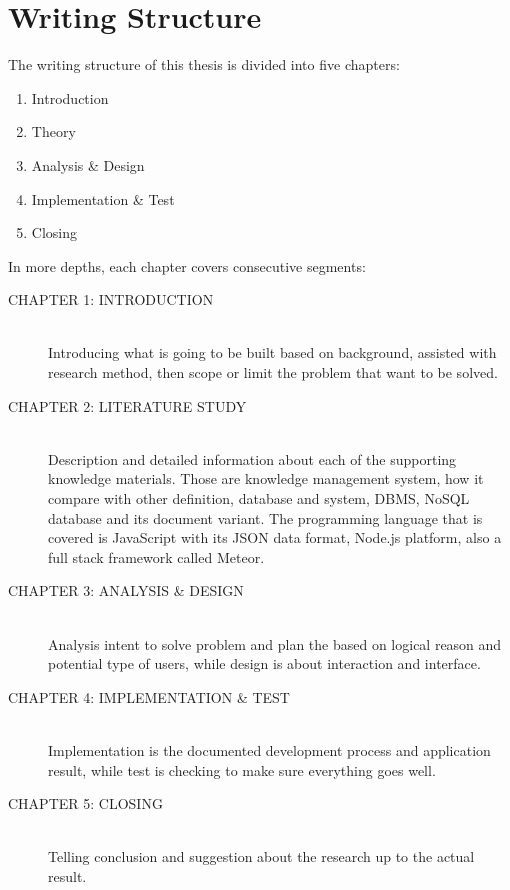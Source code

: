 \section{Writing Structure}
\label{sec:writing-structure}

The writing structure of this thesis is divided into five chapters:

\begin{enumerate}
\item Introduction
\item Theory
\item Analysis \& Design
\item Implementation \& Test
\item Closing
\end{enumerate}

\noindent In more depths, each chapter covers consecutive segments:

\begin{description}
\item [CHAPTER 1: INTRODUCTION] \hfill \\
Introducing what is going to be built based on background, assisted with research method, then scope or limit the problem that want to be solved.
\item [CHAPTER 2: LITERATURE STUDY] \hfill \\
Description and detailed information about each of the supporting knowledge materials. Those are knowledge management system, how it compare with other definition, database and system, \ac{DBMS}, \ac{NoSQL} database and its document variant. The programming language that is covered is JavaScript with its \ac{JSON} data format, Node.js platform, also a full stack framework called Meteor.
\item [CHAPTER 3: ANALYSIS \& DESIGN] \hfill \\
Analysis intent to solve problem and plan the based on logical reason and potential type of users, while design is about interaction and interface.
\item [CHAPTER 4: IMPLEMENTATION \& TEST] \hfill \\
Implementation is the documented development process and application result, while test is checking to make sure everything goes well.
\item [CHAPTER 5: CLOSING] \hfill \\
Telling conclusion and suggestion about the research up to the actual result.
\end{description}
